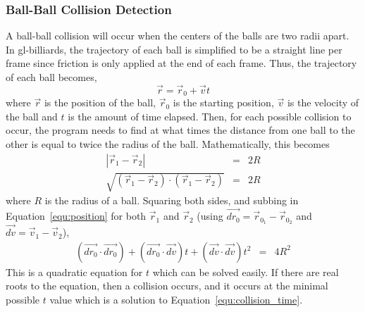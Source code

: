 \documentclass[12pt]{article}
\begin{document}
            \subsubsection{Ball-Ball Collision Detection}
            A ball-ball collision will occur when the centers of the balls are two radii apart. In gl-billiards, the trajectory
            of each ball is simplified to be a straight line per frame since friction is only applied at the end of each frame.
            Thus, the trajectory of each ball becomes,
            \begin{equation}
                \vec r = \vec r_0 + \vec v t
                \label{equ:position}
            \end{equation}
            where $\vec r$ is the position of the ball, $\vec r_0$ is the starting position, $\vec v$ is the velocity of the ball and
            $t$ is the amount of time elapsed. Then, for each possible collision to occur, the program needs to find at what times the
            distance from one ball to the other is equal to twice the radius of the ball. Mathematically, this becomes
            \begin{eqnarray}
                | \vec r_1 - \vec r_2 | &=& 2 R   \nonumber   \\
                \sqrt{ (\vec r_1 - \vec r_2) \cdot (\vec r_1 - \vec r_2) } &=& 2 R  \nonumber
            \end{eqnarray}
            where $R$ is the radius of a ball. Squaring both sides, and subbing in Equation~\ref{equ:position} for both
            $\vec r_1$ and $\vec r_2$ (using $\vec{dr_0} = \vec r_{0_1} - \vec r_{0_2}$ and $\vec{dv} = \vec v_1 - \vec v_2$),
            \begin{eqnarray}
                (\vec{dr_0} \cdot \vec{dr_0}) + (\vec{dr_0} \cdot \vec{dv}) t + (\vec{dv} \cdot \vec{dv}) t^2 &=& 4 R^2
                \label{equ:collision_time}
            \end{eqnarray}
            This is a quadratic equation for $t$ which can be solved easily. If there are real roots to the equation, then
            a collision occurs, and it occurs at the minimal possible $t$ value which is a solution to Equation~\ref{equ:collision_time}.
            
\end{document}
